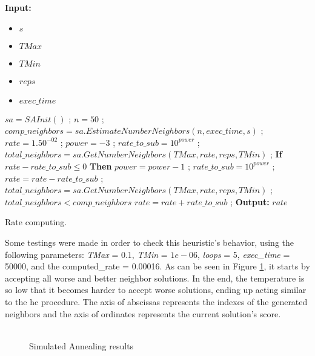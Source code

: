 \begin{algorithm}[t!]
\textbf{Input:} 
\begin{itemize}
	\setlength{\itemsep}{1pt}
	\item $s$ 
	\item $TMax$ 
	\item $TMin$ 
	\item $reps$ 
	\item $exec\_time$ 
\end{itemize}
\begin{algorithmic}
\State $sa = SAInit()$ ;
\State $n = 50$ ; 
\State $comp\_neighbors = sa.EstimateNumberNeighbors(n, exec\_time, s)$ ;
\State $rate = 1.50^{-02}$ ;
\State $power = -3$ ;
\State $rate\_to\_sub = 10^{power}$ ;
\State $total\_neighbors = sa.GetNumberNeighbors(TMax, rate, reps, TMin)$ ;
\Repeat	
	\State \textbf{If} $rate - rate\_to\_sub \leq 0$ \textbf{Then} $power = power - 1$ ; $rate\_to\_sub = 10^{power}$ ;
	\State $rate = rate - rate\_to\_sub$ ;
	\State $total\_neighbors = sa.GetNumberNeighbors(TMax, rate, reps, TMin)$ ;
\Until $total\_neighbors < comp\_neighbors$
\State $rate = rate + rate\_to\_sub$ ; 
\State \textbf{Output:} $rate$ 
\end{algorithmic}
\caption{Rate computing.}
\label{alg:RateComputing}
\end{algorithm}Some testings were made in order to check this heuristic's behavior, using the following parameters: \textit{TMax} = 0.1, \textit{TMin} = $1e-06$, \textit{loops} = 5, \textit{exec\_time} = 50000, and the computed\_rate = 0.00016. As can be seen in Figure \ref{fig:SimulatedAnnealingPlot}, it starts by accepting all worse and better neighbor solutions. In the end, the temperature is so low that it becomes harder to accept worse solutions, ending up acting similar to the \gls{hc} procedure. The axis of abscissas represents the indexes of the generated neighbors and the axis of ordinates represents the current solution's score.\\
\\
\begin{figure}[!t]
\centering


\caption{Simulated Annealing results} 
\label{fig:SimulatedAnnealingPlot}
\end{figure}

